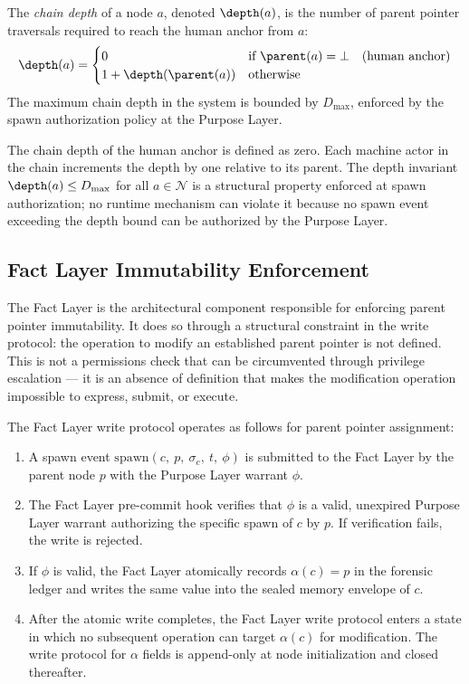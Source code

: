 \begin{dfn}
\label{dfn:chain-depth}
The \emph{chain depth} of a node $a$, denoted $\depth(a)$, is the number of parent pointer traversals required to reach the human anchor from $a$:
\begin{equation}
\depth(a) = 
\begin{cases}
0 & \text{if } \parent(a) = \bot \quad \text{(human anchor)} \\
1 + \depth(\parent(a)) & \text{otherwise}
\end{cases}
\end{equation}
The maximum chain depth in the system is bounded by $D_{\max}$, enforced by the spawn authorization policy at the Purpose Layer.
\end{dfn}

The chain depth of the human anchor is defined as zero. Each machine actor in the chain increments the depth by one relative to its parent. The depth invariant $\depth(a) \leq D_{\max}$ for all $a \in \mathcal{N}$ is a structural property enforced at spawn authorization; no runtime mechanism can violate it because no spawn event exceeding the depth bound can be authorized by the Purpose Layer.

\subsection{Fact Layer Immutability Enforcement}
\label{sec:fact-layer-immutability}

The Fact Layer is the architectural component responsible for enforcing parent pointer immutability. It does so through a structural constraint in the write protocol: the operation to modify an established parent pointer is not defined. This is not a permissions check that can be circumvented through privilege escalation --- it is an absence of definition that makes the modification operation impossible to express, submit, or execute.

The Fact Layer write protocol operates as follows for parent pointer assignment:

\begin{enumerate}
    \item[(W1)] A spawn event $\mathrm{spawn}(c,\ p,\ \sigma_c,\ t,\ \phi)$ is submitted to the Fact Layer by the parent node $p$ with the Purpose Layer warrant $\phi$.
    \item[(W2)] The Fact Layer pre-commit hook verifies that $\phi$ is a valid, unexpired Purpose Layer warrant authorizing the specific spawn of $c$ by $p$. If verification fails, the write is rejected.
    \item[(W3)] If $\phi$ is valid, the Fact Layer atomically records $\alpha(c) = p$ in the forensic ledger and writes the same value into the sealed memory envelope of $c$.
    \item[(W4)] After the atomic write completes, the Fact Layer write protocol enters a state in which no subsequent operation can target $\alpha(c)$ for modification. The write protocol for $\alpha$ fields is append-only at node initialization and closed thereafter.
\end{enumerate}

